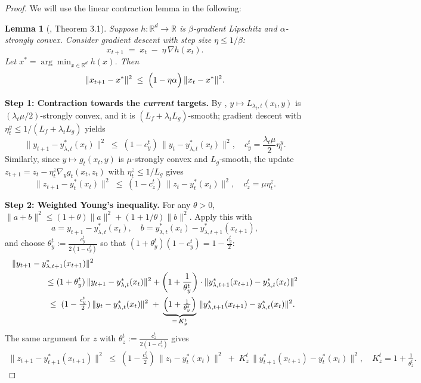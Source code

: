 \documentclass{uai2026} %
\newtheorem{lemma}{Lemma}[section]
\begin{document}
\begin{proof}
We will use the linear contraction lemma in the following:
    \begin{lemma}[\cite{bubeck2015convex}, Theorem 3.1]\label{thm:D1}
        Suppose $h:\mathbb{R}^d\to\mathbb{R}$ is $\beta$-gradient Lipschitz and $\alpha$-strongly convex.
Consider gradient descent with step size $\eta\le 1/\beta$:
\[
x_{t+1} \;=\; x_t \;-\; \eta\,\nabla h(x_t).
\]
Let $x^{*}=\arg\min_{x\in\mathbb{R}^d} h(x)$. Then
\[
\|x_{t+1}-x^{*}\|^2 \;\le\; \Bigl(1-\eta\alpha\Bigr)\,\|x_t-x^{*}\|^2.
\]
\end{lemma}
\textbf{Step 1: Contraction towards the \emph{current} targets.}
By , $y\mapsto L_{\lambda_{t},t}(x_t,y)$ is $(\lambda_{t}\mu/2)$-strongly convex, and it is $(L_f+\lambda_{t} L_g)$-smooth;
gradient descent with $\eta_t^y\le 1/(L_f+\lambda_{t} L_g)$ yields
\[
\|y_{t+1}-y^{*}_{\lambda,t}(x_t)\|^2 \;\le\; (1-c_y^{t})\,\|y_t-y^{*}_{\lambda,t}(x_t)\|^2,
\quad
c_y^{t}=\frac{\lambda_{t}\mu}{2}\eta_{t}^{y}.
\]
Similarly, since $y\mapsto g_t(x_t,y)$ is $\mu$-strongly convex and $L_g$-smooth, the update
$z_{t+1}=z_t-\eta_t^z\nabla_y g_t(x_t,z_t)$ with $\eta_t^z\le 1/L_g$ gives
\[
\|z_{t+1}-y^{*}_t(x_t)\|^2 \;\le\; (1-c_z^{t})\,\|z_t-y^{*}_t(x_t)\|^2,
\quad
c_z^{t}=\mu\eta_{t}^{z}.
\]

\textbf{Step 2: Weighted Young's inequality.}
For any $\theta>0$,
$\|a+b\|^2 \le (1+\theta)\|a\|^2+(1+1/\theta)\|b\|^2$. Apply this with
\[
a=y_{t+1}-y^{*}_{\lambda,t}(x_t),\quad
b=y^{*}_{\lambda,t}(x_t)-y^{*}_{\lambda,t+1}(x_{t+1}),
\]
and choose $\theta_y^{t}:=\frac{c_y^{t}}{2(1-c_y^{t})}$ so that $(1+\theta_y^{t})(1-c_y^{t})=1-\frac{c_y^{t}}{2}$:
\begin{align}\label{eq_0021}
    \MoveEqLeft[4]\|y_{t+1}-y^{*}_{\lambda,t+1}(x_{t+1})\|^2\nonumber\\
    &\le (1+\theta^{t}_{y})\,\|y_{t+1}-y^{*}_{\lambda,t}(x_t)\|^2
+\left(1+\frac{1}{\theta^{t}_{y}}\right)\cdot
\|y^{*}_{\lambda,t+1}(x_{t+1})-y^{*}_{\lambda,t}(x_t)\|^2\nonumber\\
&\;\le\;
(1-\tfrac{c_y^{t}}{2})\,\|y_t-y^{*}_{\lambda,t}(x_t)\|^2
\;+\;\underbrace{\Bigl(1+\tfrac{1}{\theta_y^{t}}\Bigr)}_{=\,K_y^{t}}\,
\|y^{*}_{\lambda,t+1}(x_{t+1})-y^{*}_{\lambda,t}(x_t)\|^2.
\end{align}
The same argument for $z$ with $\theta_z^{t}:=\frac{c_z^{t}}{2(1-c_z^{t})}$ gives
\begin{align}\label{eq_0022_1}
    \|z_{t+1}-y^{*}_{t+1}(x_{t+1})\|^2
\;\le\;
(1-\tfrac{c_z^{t}}{2})\,\|z_t-y^{*}_t(x_t)\|^2
\;+\;K_z^{t}\,\|y^{*}_{t+1}(x_{t+1})-y^{*}_t(x_t)\|^2,
\quad
K_z^{t}=1+\tfrac{1}{\theta_z^{t}}.
\end{align}


\end{proof}
\end{document}
